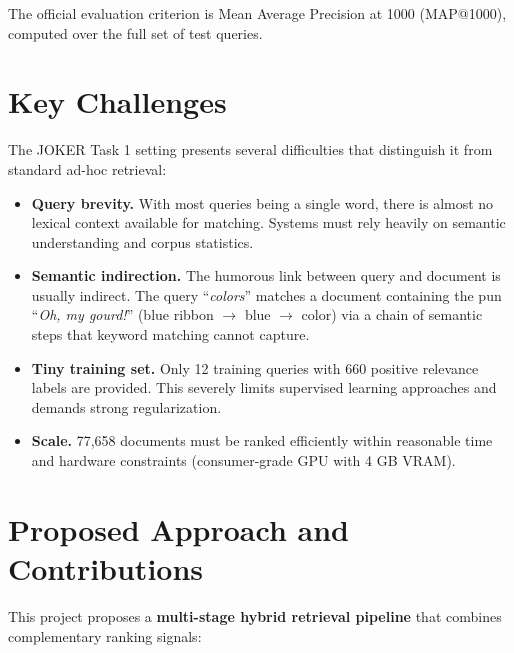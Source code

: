 The official evaluation criterion is Mean Average Precision at 1000 (MAP@1000), computed over the full set of test queries.

\section{Key Challenges}

The JOKER Task 1 setting presents several difficulties that distinguish it from standard ad-hoc retrieval:

\begin{itemize}
    \item \textbf{Query brevity.} With most queries being a single word, there is almost no lexical context available for matching. Systems must rely heavily on semantic understanding and corpus statistics.

    \item \textbf{Semantic indirection.} The humorous link between query and document is usually indirect. The query ``\textit{colors}'' matches a document containing the pun ``\textit{Oh, my gourd!}'' (blue ribbon $\to$ blue $\to$ color) via a chain of semantic steps that keyword matching cannot capture.

    \item \textbf{Tiny training set.} Only 12 training queries with 660 positive relevance labels are provided. This severely limits supervised learning approaches and demands strong regularization.

    \item \textbf{Scale.} 77,658 documents must be ranked efficiently within reasonable time and hardware constraints (consumer-grade GPU with 4 GB VRAM).
\end{itemize}

\section{Proposed Approach and Contributions}

This project proposes a \textbf{multi-stage hybrid retrieval pipeline} that combines complementary ranking signals:

